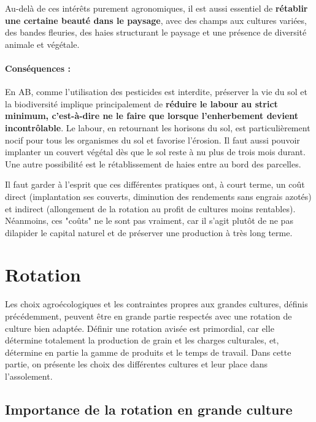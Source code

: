 \documentclass{book}
\begin{document}
Au-delà de ces intérêts purement agronomiques, il est aussi essentiel de \textbf{rétablir une certaine beauté dans le paysage}, avec des champs aux cultures variées, des bandes fleuries, des haies structurant le paysage et une présence de diversité animale et végétale.

\paragraph{Conséquences :} En AB, comme l'utilisation des pesticides est interdite, préserver la vie du sol et la biodiversité implique principalement de \textbf{réduire le labour au strict minimum, c'est-à-dire ne le faire que lorsque l'enherbement devient incontrôlable}. Le labour, en retournant les horisons du sol, est particulièrement nocif pour tous les organismes du sol et favorise l'érosion. Il faut aussi pouvoir implanter un couvert végétal dès que le sol reste à nu plus de trois mois durant. Une autre possibilité est le rétablissement de haies entre au bord des parcelles. 

Il faut garder à l'esprit que ces différentes pratiques ont, à court terme, un coût direct (implantation ses couverts, diminution des rendements sans engrais azotés) et indirect (allongement de la rotation au profit de cultures moins rentables). Néanmoins, ces "coûts" ne le sont pas vraiment, car il s'agit plutôt de ne pas dilapider le capital naturel et de préserver une production à très long terme.


\section{Rotation}

Les choix agroécologiques et les contraintes propres aux grandes cultures, définis précédemment, peuvent être en grande partie respectés avec une rotation de culture bien adaptée. Définir une rotation avisée est primordial, car elle détermine totalement la production de grain et les charges culturales, et, détermine en partie la gamme de produits et le temps de travail. Dans cette partie, on présente les choix des différentes cultures et leur place dans l'assolement.

\subsection{Importance de la rotation en grande culture}
\end{document}
